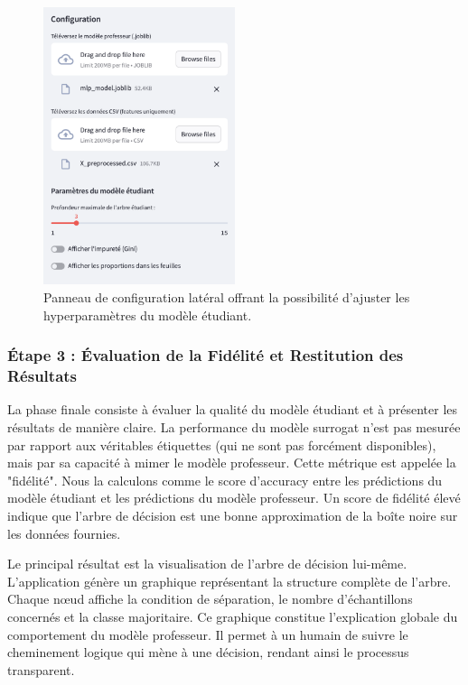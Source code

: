 \documentclass{article}
\begin{document}
\begin{figure}[h!]
    \centering
    \includegraphics[width=0.5\textwidth]{app_lateral.png}
    \caption{Panneau de configuration latéral offrant la possibilité d'ajuster les hyperparamètres du modèle étudiant.}
    \label{fig:config_panel}
\end{figure}

\clearpage

\subsubsection{Étape 3 : Évaluation de la Fidélité et Restitution des Résultats}

\quad La phase finale consiste à évaluer la qualité du modèle étudiant et à présenter les résultats de manière claire. La performance du modèle surrogat n'est pas mesurée par rapport aux véritables étiquettes (qui ne sont pas forcément disponibles), mais par sa capacité à mimer le modèle professeur. Cette métrique est appelée la "fidélité". Nous la calculons comme le score d'accuracy entre les prédictions du modèle étudiant et les prédictions du modèle professeur. Un score de fidélité élevé indique que l'arbre de décision est une bonne approximation de la boîte noire sur les données fournies.

Le principal résultat est la visualisation de l'arbre de décision lui-même. L'application génère un graphique représentant la structure complète de l'arbre. Chaque nœud affiche la condition de séparation, le nombre d'échantillons concernés et la classe majoritaire. Ce graphique constitue l'explication globale du comportement du modèle professeur. Il permet à un humain de suivre le cheminement logique qui mène à une décision, rendant ainsi le processus transparent.
\end{document}

